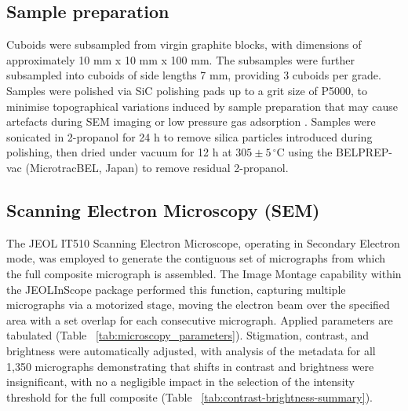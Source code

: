 \documentclass[review]{elsarticle}
\begin{document}
\begin{table}[b]
  \centering
  \caption{Formation characteristics and properties of IG-110 and IG-430 nuclear grade graphites \citep{Jones2018, ARREGUIMENA2022112047}}
  \label{tab:materialstable}
\end{table}

\subsection{Sample preparation}
Cuboids were subsampled from virgin graphite blocks, with dimensions of
approximately 10 mm x 10 mm x 100 mm. The subsamples were further subsampled
into cuboids of side lengths 7 mm, providing 3 cuboids per grade. Samples were
polished via SiC polishing pads up to a grit size of P5000, to minimise
topographical variations induced by sample preparation that may cause artefacts
during SEM imaging or low pressure gas adsorption \citep{Fang2022,Jones2018}.
Samples were sonicated in 2-propanol for 24 h to remove silica particles
introduced during polishing, then dried under vacuum for 12 h at $305 \pm 5
\,^\circ\mathrm{C}$ using the BELPREP-vac (MicrotracBEL, Japan) to remove residual
2-propanol.

\subsection{Scanning Electron Microscopy (SEM)}

The JEOL IT510 Scanning Electron Microscope, operating in Secondary Electron
mode, was employed to generate the contiguous set of micrographs from which the
full composite micrograph is assembled. The Image Montage capability within the
JEOLInScope package performed this function, capturing multiple micrographs via
a motorized stage, moving the electron beam over the specified area with a set
overlap for each consecutive micrograph. Applied parameters are tabulated (Table
~\ref{tab:microscopy_parameters}). Stigmation, contrast, and brightness were
automatically adjusted, with analysis of the metadata for all 1,350 micrographs
demonstrating that shifts in contrast and brightness were insignificant, with no
a negligible impact in the selection of the intensity threshold for the full
composite (Table ~\ref{tab:contrast-brightness-summary}). 
\end{document}
